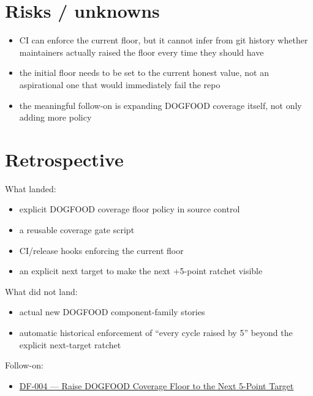 \section{Risks / unknowns}\label{record-065-risks-unknowns}

\begin{itemize}
\tightlist
\item
  CI can enforce the current floor, but it cannot infer from git history whether maintainers actually raised the floor every time they should have
\item
  the initial floor needs to be set to the current honest value, not an aspirational one that would immediately fail the repo
\item
  the meaningful follow-on is expanding DOGFOOD coverage itself, not only adding more policy
\end{itemize}

\section{Retrospective}\label{record-065-retrospective}

What landed:

\begin{itemize}
\tightlist
\item
  explicit DOGFOOD coverage floor policy in source control
\item
  a reusable coverage gate script
\item
  CI/release hooks enforcing the current floor
\item
  an explicit next target to make the next +5-point ratchet visible
\end{itemize}

What did not land:

\begin{itemize}
\tightlist
\item
  actual new DOGFOOD component-family stories
\item
  automatic historical enforcement of ``every cycle raised by 5'' beyond the explicit next-target ratchet
\end{itemize}

Follow-on:

\begin{itemize}
\tightlist
\item
  \href{https://github.com/flyingrobots/bijou/blob/cbd70612140e7a450d764b3c7be1c6af878b99bc/docs/method/graveyard/legacy-backlog/DF-004-raise-dogfood-coverage-floor-to-next-target.md}{DF-004 --- Raise DOGFOOD Coverage Floor to the Next 5-Point Target}
\end{itemize}

